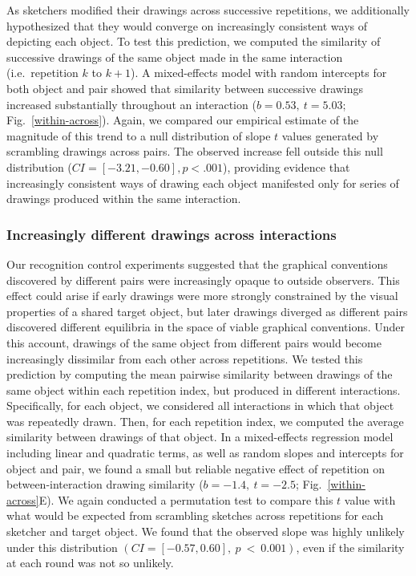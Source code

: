 As sketchers modified their drawings across successive repetitions, we additionally hypothesized that they would converge on increasingly consistent ways of depicting each object.
To test this prediction, we computed the similarity of successive drawings of the same object made in the same interaction (i.e.~repetition $k$ to $k+1$). %
A mixed-effects model with random intercepts for both object and pair showed that similarity between successive drawings increased substantially throughout an interaction ($b = 0.53,~t = 5.03$; Fig.~\ref{within-across}).
Again, we compared our empirical estimate of the magnitude of this trend to a null distribution of slope $t$ values generated by scrambling drawings across pairs. %
The observed increase fell outside this null distribution ($CI = [-3.21, -0.60], p < .001$), providing evidence that increasingly consistent ways of drawing each object manifested only for series of drawings produced within the same interaction.

\subsubsection{Increasingly different drawings across interactions}

Our recognition control experiments suggested that the graphical conventions discovered by different pairs were increasingly opaque to outside observers.
This effect could arise if early drawings were more strongly constrained by the visual properties of a shared target object, but later drawings diverged as different pairs discovered different equilibria in the space of viable graphical conventions.
Under this account, drawings of the same object from different pairs would become increasingly dissimilar from each other across repetitions.
We tested this prediction by computing the mean pairwise similarity between drawings of the same object within each repetition index, but produced in different interactions.
Specifically, for each object, we considered all interactions in which that object was repeatedly drawn.
Then, for each repetition index, we computed the average similarity between drawings of that object.
In a mixed-effects regression model including linear and quadratic terms, as well as random slopes and intercepts for object and pair, we found a small but reliable negative effect of repetition on between-interaction drawing similarity ($b = -1.4, ~t = -2.5$; Fig.~\ref{within-across}E). %
We again conducted a permutation test to compare this $t$ value with what would be expected from scrambling sketches across repetitions for each sketcher and target object.
We found that the observed slope was highly unlikely under this distribution $(CI = [-0.57, 0.60],~p~<~0.001)$, even if the similarity at each round was not so unlikely.


